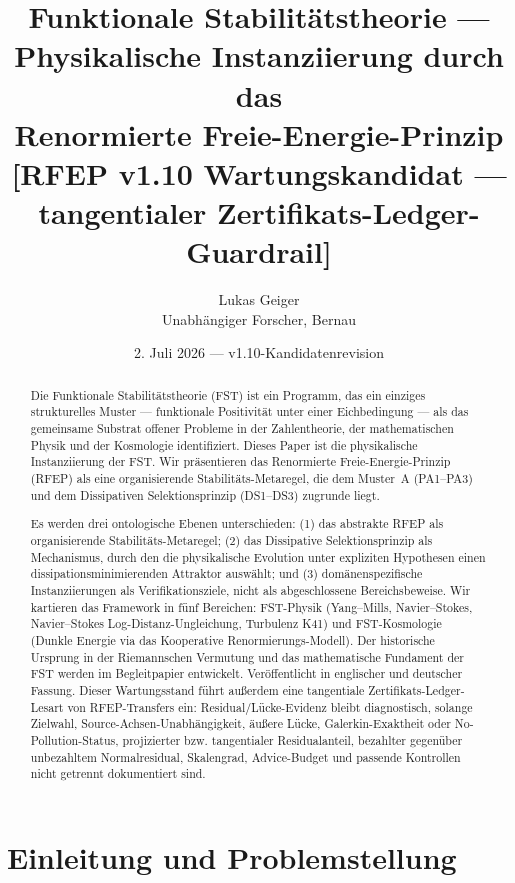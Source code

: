 \documentclass[11pt,a4paper]{article}
\title{Funktionale Stabilitätstheorie --- Physikalische Instanziierung durch das\\
Renormierte Freie-Energie-Prinzip\\
\vspace{0.3em}
{\large [RFEP v1.10 Wartungskandidat --- tangentialer Zertifikats-Ledger-Guardrail]}}
\author{Lukas Geiger\\
\small Unabhängiger Forscher, Bernau}
\date{2. Juli 2026 --- v1.10-Kandidatenrevision}
\theoremstyle{plain}
\theoremstyle{definition}
\begin{document}
\maketitle

\begin{abstract}
Die Funktionale Stabilitätstheorie (FST) ist ein Programm, das ein einziges
strukturelles Muster --- funktionale Positivität unter einer Eichbedingung ---
als das gemeinsame Substrat offener Probleme in der Zahlentheorie, der mathematischen Physik
und der Kosmologie identifiziert. Dieses Paper ist die physikalische Instanziierung der FST.
Wir präsentieren das Renormierte Freie-Energie-Prinzip (RFEP) als eine organisierende Stabilitäts-Metaregel,
die dem Muster~A (PA1--PA3) und dem Dissipativen Selektionsprinzip (DS1--DS3) zugrunde liegt.

Es werden drei ontologische Ebenen unterschieden: (1) das abstrakte RFEP als
organisierende Stabilitäts-Metaregel; (2) das Dissipative Selektionsprinzip
als Mechanismus, durch den die physikalische Evolution unter expliziten
Hypothesen einen dissipationsminimierenden Attraktor auswählt; und
(3) domänenspezifische Instanziierungen als Verifikationsziele, nicht als
abgeschlossene Bereichsbeweise. Wir kartieren das Framework in fünf
Bereichen: FST-Physik (Yang--Mills, Navier--Stokes, Navier--Stokes
Log-Distanz-Ungleichung, Turbulenz K41) und FST-Kosmologie (Dunkle Energie
via das Kooperative Renormierungs-Modell).
Der historische Ursprung in der Riemannschen Vermutung und das mathematische Fundament
der FST werden im Begleitpapier \cite{ZetaZooMaster} entwickelt. Veröffentlicht in englischer und deutscher Fassung.
Dieser Wartungsstand führt außerdem eine tangentiale Zertifikats-Ledger-
Lesart von RFEP-Transfers ein: Residual/Lücke-Evidenz bleibt
diagnostisch, solange Zielwahl, Source-Achsen-Unabhängigkeit, äußere
Lücke, Galerkin-Exaktheit oder No-Pollution-Status, projizierter bzw.
tangentialer Residualanteil, bezahlter gegenüber unbezahltem
Normalresidual, Skalengrad, Advice-Budget und passende Kontrollen
nicht getrennt dokumentiert sind.
\end{abstract}

\tableofcontents

\section{Einleitung und Problemstellung}
\label{sec:intro}
\end{document}
